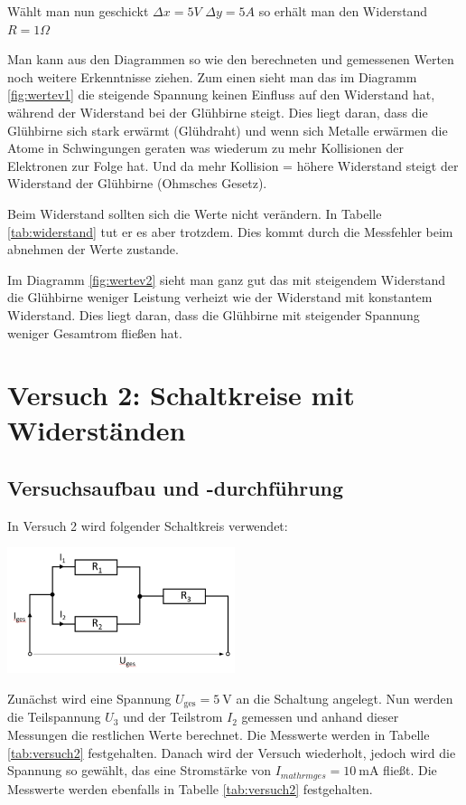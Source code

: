      Wählt man nun geschickt $\Delta x= 5V$  $\Delta y=5A$ so erhält man den Widerstand $R = 1 \Omega$

    Man kann aus den Diagrammen so wie den berechneten und gemessenen Werten noch weitere Erkenntnisse ziehen. Zum einen sieht man das im Diagramm \ref{fig:wertev1} die steigende Spannung keinen Einfluss auf den Widerstand hat, während der Widerstand bei der Glühbirne steigt. Dies liegt daran, dass die Glühbirne sich stark erwärmt (Glühdraht) und wenn sich Metalle erwärmen die Atome in Schwingungen geraten was wiederum zu mehr Kollisionen der Elektronen zur Folge hat. Und da mehr Kollision = höhere Widerstand steigt der Widerstand der Glühbirne (Ohmsches Gesetz). 
    
    Beim Widerstand sollten sich die Werte nicht verändern. In Tabelle \ref{tab:widerstand} tut er es aber trotzdem. Dies kommt durch die Messfehler beim abnehmen der Werte zustande. 

Im Diagramm \ref{fig:wertev2} sieht man ganz gut das mit steigendem Widerstand die Glühbirne weniger Leistung verheizt wie der Widerstand mit konstantem Widerstand. Dies liegt daran, dass die Glühbirne mit steigender Spannung weniger Gesamtrom fließen hat.
\section{Versuch 2: Schaltkreise mit Widerständen}

    \subsection{Versuchsaufbau und -durchführung}

        In Versuch 2 wird folgender Schaltkreis verwendet:
\newpage
			\begin{center}
				 \includegraphics[width=0.5\textwidth]{bilder/Physik_04.png}
				\label{fig:versuch2}
			\end{center}
           

		\vspace{1em}
        Zunächst wird eine Spannung $U_{\mathrm{ges}} = 5\ \mathrm{V}$ an die Schaltung angelegt. Nun werden die Teilspannung $U_{3}$ und der Teilstrom $I_{2}$ gemessen und anhand dieser Messungen die restlichen Werte berechnet. Die Messwerte werden in Tabelle \ref{tab:versuch2} festgehalten.
        Danach wird der Versuch wiederholt, jedoch wird die Spannung so gewählt, das eine Stromstärke von $I_{mathrm{ges}} = 10\ \mathrm{mA}$ fließt. Die Messwerte werden ebenfalls in Tabelle \ref{tab:versuch2} festgehalten.

